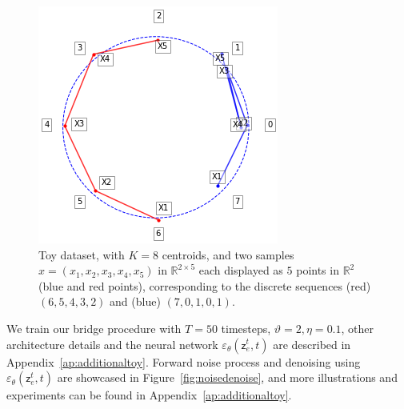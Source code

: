 \documentclass[nohyperref]{article}
\theoremstyle{plain}
\theoremstyle{definition}
\theoremstyle{remark}
\newcommand{\rset}{\mathbb{R}}
\newcommand{\latentcont}{\mathsf{z}_e}
\newcommand{\latentdis}{\mathsf{z}_q}
\newcommand{\rme}{\mathrm{e}}
\begin{document}

\begin{figure}[h!]
    \centering
    \includegraphics[scale=0.45]{images/centroids2.png}
    \caption{Toy dataset, with $K=8$ centroids, and two samples $x = (x_1,x_2,x_3,x_4,x_5)$ in $\rset^{2 \times 5}$ each displayed as $5$ points in $\rset^{2}$ (blue and red points), corresponding to the discrete sequences (red) $(6,5,4,3,2)$ and (blue) $(7,0,1,0,1)$.}
    \label{fig:toydata}
\end{figure}

We train our bridge procedure with $T=50$ timesteps, $\vartheta=2, \eta=0.1$, other architecture details and the neural network $\varepsilon_\theta(\latentcont^t ,t)$ are described in Appendix~\ref{ap:additionaltoy}. Forward noise process and denoising using $\varepsilon_\theta(\latentcont^t ,t)$ are showcased in Figure~\ref{fig:noisedenoise}, and more illustrations and experiments can be found in Appendix~\ref{ap:additionaltoy}. 
\end{document}
